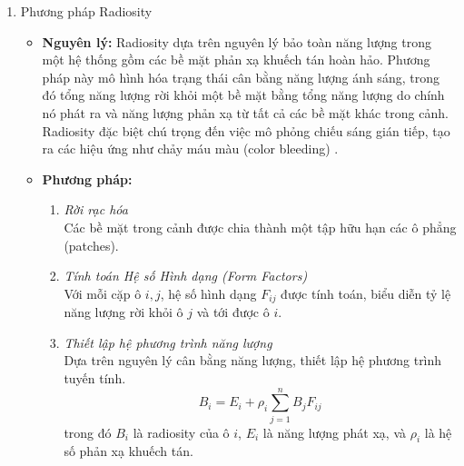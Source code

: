 \begin{enumerate}
\begin{itemize}
		\item \textbf{Đóng góp:}  
		Phương trình kết xuất cung cấp một khuôn khổ lý thuyết thống nhất cho hầu hết các thuật toán kết xuất dựa trên vật lý. Nó cho phép mô phỏng một cách tự nhiên và toàn diện các hiện tượng quang học phức tạp như chiếu sáng gián tiếp, bóng đổ mềm, phản xạ gương và khuếch tán, tụ quang (caustic) và độ sâu trường ảnh (depth of field). Phương trình này là nền tảng của hầu hết các trình kết xuất quang thực hiện đại trong điện ảnh và kỹ xảo.
		
		\item \textbf{Hạn chế:}  
		Chi phí tính toán rất cao do tốc độ hội tụ chậm của các phương pháp Monte Carlo. Bản chất ngẫu nhiên của quá trình lấy mẫu dẫn đến nhiễu (noise) trong hình ảnh, đặc biệt ở các vùng có đường đi ánh sáng phức tạp. Do đó, các phương pháp dựa trực tiếp trên phương trình kết xuất thường không phù hợp cho các ứng dụng thời gian thực.
	\end{itemize}
	
	\item Phương pháp Radiosity
	\begin{itemize}
		\item \textbf{Nguyên lý:}
		Radiosity dựa trên nguyên lý bảo toàn năng lượng trong một hệ thống gồm các bề mặt phản xạ khuếch tán hoàn hảo. Phương pháp này mô hình hóa trạng thái cân bằng năng lượng ánh sáng, trong đó tổng năng lượng rời khỏi một bề mặt bằng tổng năng lượng do chính nó phát ra và năng lượng phản xạ từ tất cả các bề mặt khác trong cảnh. Radiosity đặc biệt chú trọng đến việc mô phỏng chiếu sáng gián tiếp, tạo ra các hiệu ứng như chảy máu màu (color bleeding) \cite{radiosity1}.
		
		\item \textbf{Phương pháp:}
		\begin{enumerate}
			\item \textit{Rời rạc hóa}\\
			Các bề mặt trong cảnh được chia thành một tập hữu hạn các ô phẳng (patches).
			
			\item \textit{Tính toán Hệ số Hình dạng (Form Factors)}\\
			Với mỗi cặp ô $i, j$, hệ số hình dạng $F_{ij}$ được tính toán, biểu diễn tỷ lệ năng lượng rời khỏi ô $j$ và tới được ô $i$.
			
			\item \textit{Thiết lập hệ phương trình năng lượng}\\
			Dựa trên nguyên lý cân bằng năng lượng, thiết lập hệ phương trình tuyến tính.
			\[
			B_i = E_i + \rho_i \sum_{j=1}^{n} B_j F_{ij}
			\]
			trong đó \(B_i\) là radiosity của ô \(i\), \(E_i\) là năng lượng phát xạ, và \(\rho_i\) là hệ số phản xạ khuếch tán.
			

\end{enumerate}
\end{itemize}
\end{enumerate}

